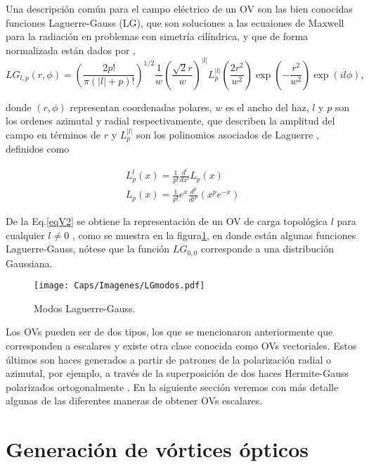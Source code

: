 Una descripción común para el campo eléctrico de un OV son las bien conocidas funciones Laguerre-Gauss (LG), que son soluciones a las ecuaiones de Maxwell para la radiación en problemas con simetría cilíndrica, y que de forma normalizada están dados por \cite{Uribe2011},
\begin{equation}
\label{eqV2}
	LG_{l,p}(r,\phi) = (\frac{2p!}{\pi (|l|+p)!})^{1/2} \frac{1}{w} (\frac{\sqrt{2}r}{w})^{|l|} L_{p}^{|l|}(\frac{2r^2}{w^2}) \exp (-\frac{r^2}{w^2}) \exp (il\phi),
\end{equation}

donde $(r,\phi)$ representan coordenadas polares, $w$ es el ancho del haz, $l$ y $p$ son los ordenes azimutal y radial respectivamente, que describen la amplitud del campo en términos de $r$ y $L_p^{|l|}$ son los polinomios asociados de Laguerre \cite{SepulvedaSoto2009}, definidos como 

\begin{equation}
\label{eqV3}
\begin{matrix}
	L_p^l(x) = \frac{1}{p!} \frac{d^l}{dx^l} L_p(x)\\
	L_p(x) = \frac{1}{p!} e^x \frac{d^p}{dt^p} (x^p e^{-x})
	 \end{matrix}
\end{equation}


De la Eq.\ref{eqV2} se obtiene la representación de un OV de carga topológica $l$ para cualquier $l \neq 0$ \cite{Uribe2011}, como se muestra en la figura\ref{fig:modsLG}, en donde están algunas funciones Laguerre-Gauss, nótese que la función $LG_{0,0}$ corresponde a una distribución Gaussiana.\\

\begin{figure}[!ht]
  \centering
    \texttt{[image: Caps/Imagenes/LGmodos.pdf]}
  \caption{Modos Laguerre-Gauss.}
  \label{fig:modsLG}
\end{figure}


Los OVs pueden ser de dos tipos, los que se mencionaron anteriormente que corresponden a escalares y existe otra clase conocida como OVs vectoriales. Estos últimos son haces generados a partir de patrones de la polarización radial o azimutal, por ejemplo, a través de la superposición de dos haces Hermite-Gauss polarizados ortogonalmente \cite{Cheng2009, Zhan2009}. En la siguiente sección veremos con más detalle algunas de las diferentes maneras de obtener OVs escalares.

\section{Generación de vórtices ópticos}
\label{sec:generacion_vortices}


